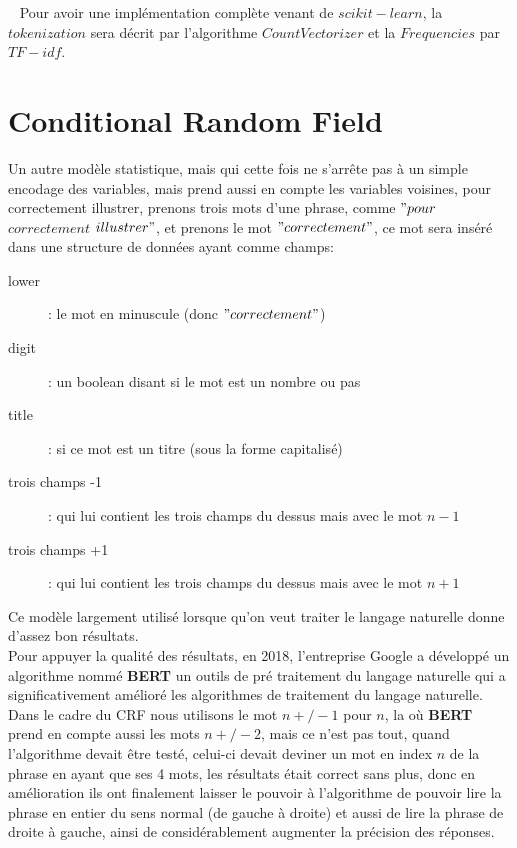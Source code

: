 \ \linebreak
Pour avoir une implémentation complète venant de $scikit-learn$, la $tokenization$ sera décrit par l'algorithme $CountVectorizer$ et la $Frequencies$ par $TF-idf$.\\
\pagebreak

\section{Conditional Random Field}
Un autre modèle statistique, mais qui cette fois ne s'arrête pas à un simple encodage des variables, mais prend aussi en compte les variables voisines, pour correctement illustrer, prenons trois mots d'une phrase, comme $"pour$ $correctement$ $illustrer"$, et prenons le mot $"correctement"$, ce mot sera inséré dans une structure de données ayant comme champs:
\begin{description}
\item[lower]: le mot en minuscule (donc $"correctement"$)
\item[digit]: un boolean disant si le mot est un nombre ou pas
\item[title]: si ce mot est un titre (sous la forme capitalisé)
\item[trois champs -1]: qui lui contient les trois champs du dessus mais avec le mot $n-1$ 
\item[trois champs +1]: qui lui contient les trois champs du dessus mais avec le mot $n+1$ 
\end{description}

Ce modèle largement utilisé lorsque qu'on veut traiter le langage naturelle donne d'assez bon résultats.\\
\linebreak
Pour appuyer la qualité des résultats, en 2018, l'entreprise Google a développé un algorithme nommé \textbf{BERT} un outils de pré traitement du langage naturelle qui a significativement amélioré les algorithmes de traitement du langage naturelle. Dans le cadre du CRF nous utilisons le mot $n+/-1$ pour $n$, la où \textbf{BERT} prend en compte aussi les mots $n+/-2$, mais ce n'est pas tout, quand l'algorithme devait être testé, celui-ci devait deviner un mot en index $n$ de la phrase en ayant que ses 4 mots, les résultats était correct sans plus, donc en amélioration ils ont finalement laisser le pouvoir à l'algorithme de pouvoir lire la phrase en entier du sens normal (de gauche à droite) et aussi de lire la phrase de droite à gauche, ainsi de considérablement augmenter la précision des réponses.